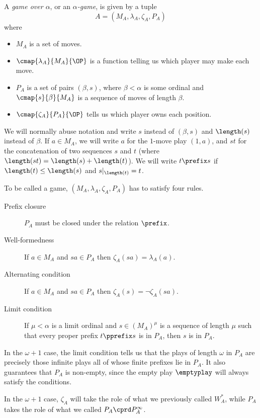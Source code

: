 \documentclass[11pt]{article} %
\begin{document}
\begin{definition}
  A \emph{game over $\alpha$}, or an \emph{$\alpha$-game}, is given by a tuple
  \[
    A = (M_A, \lambda_A, \zeta_A, P_A)
    \]
  where
  \begin{itemize}
    \item $M_A$ is a set of moves.
    \item $\cmap{\lambda_A}{M_A}{\OP}$ is a function telling us which player may make each move.
    \item $P_A$ is a set of pairs $(\beta, s)$, where $\beta<\alpha$ is some ordinal and $\cmap{s}{\beta}{M_A}$ is a sequence of moves of length $\beta$.  
    \item $\cmap{\zeta_A}{P_A}{\OP}$ tells us which player owns each position.
  \end{itemize}

  We will normally abuse notation and write $s$ instead of $(\beta, s)$ and $\length(s)$ instead of $\beta$.  If $a\in M_A$, we will write $a$ for the $1$-move play $(1, a)$, and $st$ for the concatenation of two sequences $s$ and $t$ (where $\length(st)=\length(s)+\length(t)$).  We will write $t\prefix s$ if $\length(t)\le\length(s)$ and $s\vert_{\length(t)}=t$.  

  To be called a game, $(M_A, \lambda_A, \zeta_A, P_A)$ has to satisfy four rules.
  \begin{description}
    \item[Prefix closure] $P_A$ must be closed under the relation $\prefix$.  
    \item[Well-formedness] If $a\in M_A$ and $sa\in P_A$ then $\zeta_A(sa)=\lambda_A(a)$.  
    \item[Alternating condition] If $a\in M_A$ and $sa\in P_A$ then $\zeta_A(s)=\neg\zeta_A(sa)$.
    \item[Limit condition] If $\mu<\alpha$ is a limit ordinal and $s\in(M_A)^\mu$ is a sequence of length $\mu$ such that every proper prefix $t\pprefix s$ is in $P_A$, then $s$ is in $P_A$.  
  \end{description}
\end{definition}

\begin{remark}
  In the $\omega+1$ case, the limit condition tells us that the plays of length $\omega$ in $P_A$ are precisely those infinite plays all of whose finite prefixes lie in $P_A$.  It also guarantees that $P_A$ is non-empty, since the empty play $\emptyplay$ will always satisfy the conditions.

  In the $\omega+1$ case, $\zeta_A$ will take the role of what we previously called $W_A^*$, while $P_A$ takes the role of what we called $P_A\cprd P_A^\infty$.  
\end{remark}
\end{document}
